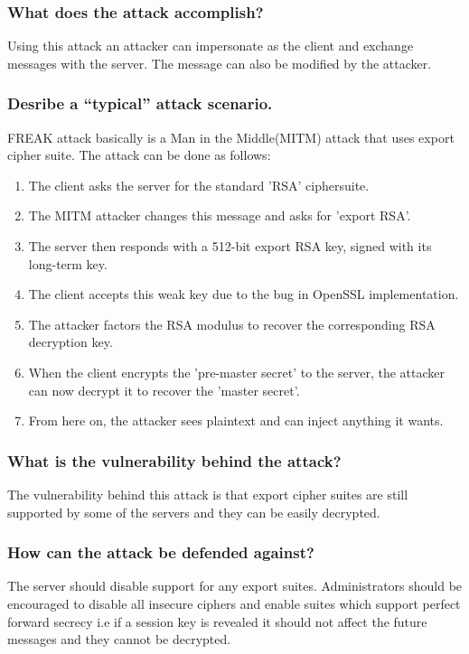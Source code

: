 \documentclass{article}
\begin{document}
\subsubsection{What does the attack accomplish?}
\indent \indent Using this attack an attacker can impersonate as the client and exchange messages with the server. The message can also be modified by the attacker.

\subsubsection{Desribe a “typical” attack scenario.}
\indent \indent FREAK attack basically is a  Man in the Middle(MITM) attack that uses export cipher suite. The attack can be done as follows: \\
\begin{enumerate}
 \item The client asks the server for the standard 'RSA' ciphersuite.
 \item The MITM attacker changes this message and asks for 'export RSA'.
 \item The server then responds with a 512-bit export RSA key, signed with its long-term key.
 \item The client accepts this weak key due to the bug in OpenSSL implementation.
 \item The attacker factors the RSA modulus to recover the corresponding RSA decryption key.
 \item When the client encrypts the 'pre-master secret' to the server, the attacker can now decrypt it to recover the 'master secret'.
 \item From here on, the attacker sees plaintext and can inject anything it wants.
\end{enumerate}

\subsubsection{What is the vulnerability behind the attack?}
\indent \indent The vulnerability behind this attack is that export cipher suites are still supported by some of the servers and they can be easily decrypted.

\subsubsection{How can the attack be defended against?}
\indent \indent The server should disable support for any export suites. Administrators should be encouraged to disable all insecure ciphers and enable suites which support perfect forward secrecy i.e if a session key is revealed it should not affect the future messages and they cannot be decrypted.
\end{document}
